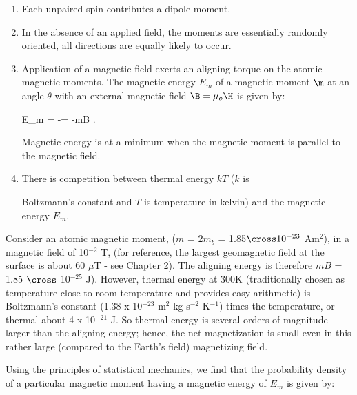 \begin{enumerate}

\item Each unpaired spin contributes a dipole moment. 

\item In the absence of an applied
field, the moments are essentially randomly oriented, \ie
all directions are equally likely to occur.

\item Application of a magnetic field exerts an aligning torque  on the atomic magnetic moments.  The 
magnetic energy $E_m$ of a 
magnetic moment $\m$ at an angle $\theta$ with an external magnetic
 field $\B=\mu_o \H$ is given by:


\beq
E_m = -\m \cdot \B = -mB  \cos \theta.
\label{eq:Em}
\eeq



 Magnetic energy is at a minimum when the
magnetic moment is parallel to the magnetic field.  

\item There is  competition between
 thermal energy $kT$ 
($k$ is 

Boltzmann's constant and $T$ is
temperature in kelvin) and the 
magnetic energy $E_m$.  
\end{enumerate}

Consider an atomic magnetic moment, ($m$ = 2$m_b$ = 1.85$\cross 10^{-23}$
Am$^2$), in a magnetic field of 10$^{-2}$ T, (for reference, the largest  geomagnetic field at the surface is about 60 $\mu$T - see Chapter 2). The aligning energy is therefore 
$mB$ = 1.85 $\cross$ 10$^{-25}$ J). However, thermal energy at 300K
(traditionally chosen as temperature close to room temperature and provides easy arithmetic) is 
Boltzmann's constant (1.38 x 10$^{-23}$ m$^2$ kg s$^{-2}$ K$^{-1}$) times the temperature,  or thermal  about  4 x 10$^{-21}$ J.   So thermal energy is several orders of magnitude larger than the
aligning energy; hence, the net magnetization is small even in this rather large (compared to the Earth's field) magnetizing field.




Using the principles of 
statistical mechanics, we find that the
probability  density of a particular magnetic moment having a 
magnetic energy of  $E_m$ is given by:


